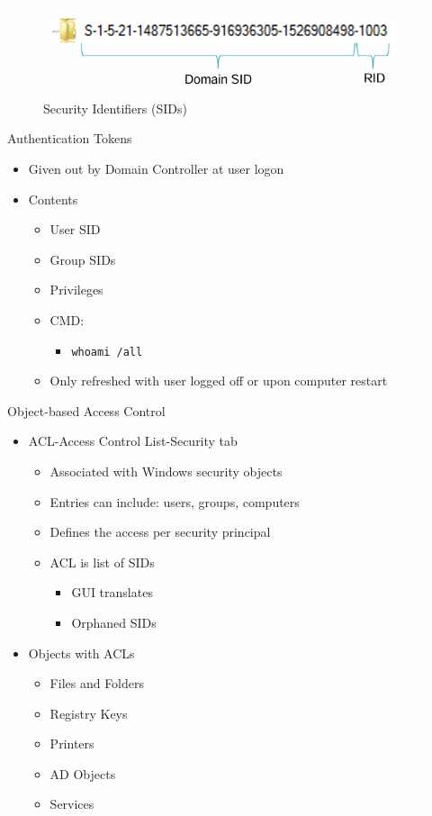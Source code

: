 \begin{figure}
    \centering
    \includegraphics[width=0.75\linewidth]{sid.png}
    \caption{Security Identifiers (SIDs)}
    \label{fig:placeholder}
\end{figure}

Authentication Tokens
\begin{itemize}
    \item Given out by Domain Controller at user logon
    \item Contents
    \begin{itemize}
        \item User SID
        \item Group SIDs
        \item Privileges
        \item CMD:
        \begin{itemize}
            \item \texttt{whoami /all}
        \end{itemize}
    \item Only refreshed with user logged off or upon computer restart
    \end{itemize}
\end{itemize}

Object-based Access Control
\begin{itemize}
    \item ACL-Access Control List-Security tab
    \begin{itemize}
        \item Associated with Windows security objects
        \item Entries can include: users, groups, computers
        \item Defines the access per security principal
        \item ACL is list of SIDs
        \begin{itemize}
            \item GUI translates
            \item Orphaned SIDs
        \end{itemize}
    \end{itemize}
\item Objects with ACLs
\begin{itemize}
    \item Files and Folders
    \item Registry Keys
    \item Printers
    \item AD Objects
    \item Services
\end{itemize}
\end{itemize}

